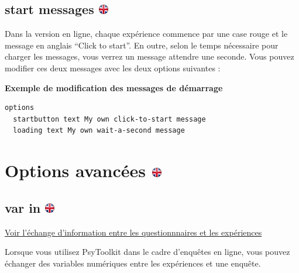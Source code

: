 \documentclass[
]{book}
\begin{document}
\hypertarget{start-messages}{%
\subsection[start messages ]{\texorpdfstring{start messages
\href{https://www.psytoolkit.org/doc3.2.0/syntax.html\#options-start-messages}{\protect\includegraphics{img/ukflag.png}}}{start messages }}\label{start-messages}}

Dans la version en ligne, chaque expérience commence par une case rouge
et le message en anglais ``Click to start''. En outre, selon le temps
nécessaire pour charger les messages, vous verrez un message attendre
une seconde. Vous pouvez modifier ces deux messages avec les deux
options suivantes :

\textbf{Exemple de modification des messages de démarrage}

\begin{verbatim}
options
  startbutton text My own click-to-start message
  loading text My own wait-a-second message
\end{verbatim}

\hypertarget{options-avancuxe9es}{%
\section[Options avancées ]{\texorpdfstring{Options avancées
\href{https://www.psytoolkit.org/doc3.2.0/syntax.html\#advanced_options}{\protect\includegraphics{img/ukflag.png}}}{Options avancées }}\label{options-avancuxe9es}}

\hypertarget{var-in}{%
\subsection[var in ]{\texorpdfstring{var in
\href{https://www.psytoolkit.org/doc3.2.0/syntax.html\#_var_in}{\protect\includegraphics{img/ukflag.png}}}{var in }}\label{var-in}}

\protect\hyperlink{s11}{Voir l'échange d'information entre les
questionnnaires et les expériences}

Lorsque vous utilisez PsyToolkit dans le cadre d'enquêtes en ligne, vous
pouvez échanger des variables numériques entre les expériences et une
enquête.
\end{document}
